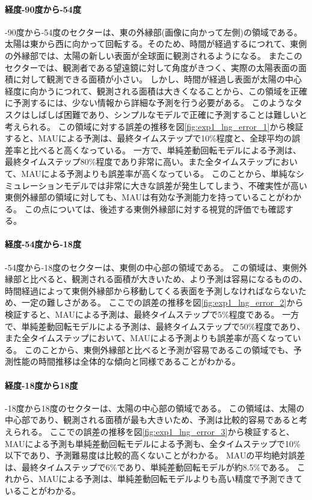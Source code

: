           \paragraph{経度-90度から-54度}
          -90度から-54度のセクターは、東の外縁部(画像に向かって左側)の領域である。
          太陽は東から西に向かって回転する。そのため、時間が経過するにつれて、東側の外縁部では、太陽の新しい表面が全球面に観測されるようになる。
          またこのセクターでは、観測者である望遠鏡に対して角度がきつく、実際の太陽表面の面積に対して観測できる面積が小さい。
          しかし、時間が経過し表面が太陽の中心経度に向かうにつれて、観測される面積は大きくなることから、この領域を正確に予測するには、少ない情報から詳細な予測を行う必要がある。
          このようなタスクはしばしば困難であり、シンプルなモデルで正確に予測することは難しいと考えられる。
          この領域に対する誤差の推移を図\ref{fig:exp1_lng_error_1}から検証すると、MAUによる予測は、最終タイムステップで10\%程度と、全球平均の誤差率と比べると高くなっている。
          一方で、単純差動回転モデルによる予測は、最終タイムステップ80\%程度であり非常に高い。また全タイムステップにおいて、MAUによる予測よりも誤差率が高くなっている。
          このことから、単純なシミュレーションモデルでは非常に大きな誤差が発生してしまう、不確実性が高い東側外縁部の領域に対しても、MAUは有効な予測能力を持っていることがわかる。
          この点については、後述する東側外縁部に対する視覚的評価でも確認する。

          \paragraph{経度-54度から-18度}
          -54度から-18度のセクターは、東側の中心部の領域である。
          この領域は、東側外縁部と比べると、観測される面積が大きいため、より予測は容易になるものの、時間経過によって東側外縁部から移動してくる表面を予測しなければならないため、一定の難しさがある。
          ここでの誤差の推移を図\ref{fig:exp1_lng_error_2}から検証すると、MAUによる予測は、最終タイムステップで5\%程度である。
          一方で、単純差動回転モデルによる予測は、最終タイムステップで50\%程度であり、また全タイムステップにおいて、MAUによる予測よりも誤差率が高くなっている。
          このことから、東側外縁部と比べると予測が容易であるこの領域でも、予測性能の時間推移は全体的な傾向と同様であることがわかる。

          \paragraph{経度-18度から18度}
          -18度から18度のセクターは、太陽の中心部の領域である。
          この領域は、太陽の中心部であり、観測される面積が最も大きいため、予測は比較的容易であると考えられる。
          ここでの誤差の推移を図\ref{fig:exp1_lng_error_3}から検証すると、MAUによる予測も単純差動回転モデルによる予測も、全タイムステップで10\%以下であり、予測難易度は比較的高くないことがわかる。
          MAUの平均絶対誤差は、最終タイムステップで6\%であり、単純差動回転モデルが約8.5\%である。
          これから、MAUによる予測は、単純差動回転モデルよりも高い精度で予測できていることがわかる。
          
